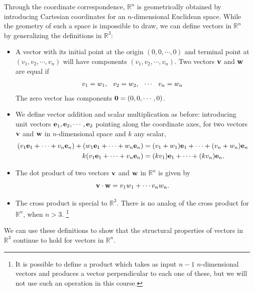 \documentclass[12pt,letterpaper,reqno]{article}
\numberwithin{equation}{section}
\begin{document}
Through the coordinate correspondence, $\mathbb{R}^n$ is geometrically obtained by introducing Cartesian coordinates for an $n$-dimensional Euclidean space. While the geometry of such a space is impossible to draw, we can define vectors in $\mathbb{R}^n$ by generalizing the definitions in $\mathbb{R}^3$:
\begin{itemize}
	\item A vector with its initial point at the origin $(0,0,\cdots,0)$ and terminal point at $(v_1,v_2,\cdots,v_n)$ will have components $(v_1,v_2,\cdots,v_n)$. Two vectors ${\bf v}$ and ${\bf w}$ are equal if 
	\begin{align*}
		v_1=w_1, \hspace{0.25cm} v_2=w_2, \hspace{0.25cm} \cdots \hspace{0.25cm} v_n=w_n
	\end{align*}
	The zero vector has components ${\bf 0}=(0,0,\cdots,0)$.
	\item We define vector addition and scalar multiplication as before: introducing unit vectors ${\bf e}_1, {\bf e}_2, \cdots, {\bf e}_2$ pointing along the coordinate axes, for two vectors ${\bf v}$ and ${\bf w}$ in $n$-dimensional space and $k$ any scalar,
\begin{align*}
	(v_1{\bf e}_1+\cdots+v_n{\bf e}_n)+(w_1{\bf e}_1+\cdots+w_n{\bf e}_n)&=(v_1+w_1){\bf e}_1+\cdots +(v_n+w_n){\bf e}_n \\
	k(v_1{\bf e}_1+\cdots+v_n{\bf e}_n)&=(kv_1){\bf e}_1+\cdots+(kv_n){\bf e}_n.
\end{align*}
\item The dot product of two vectors ${\bf v}$ and ${\bf w}$ in $\mathbb{R}^n$ is given by
\begin{align*}
	{\bf v}\cdot {\bf w}=v_1w_1+\cdots v_nw_n.
\end{align*}
\item The cross product is special to $\mathbb{R}^3$. There is no analog of the cross product for $\mathbb{R}^n$, when $n>3$. \footnote{It is possible to define a product which takes as input $n-1$ $n$-dimensional vectors and produces a vector perpendicular to each one of these, but we will not use such an operation in this course.}
\end{itemize}

We can use these definitions to show that the structural properties of vectors in $\mathbb{R}^3$ continue to hold for vectors in $\mathbb{R}^n$.
\end{document}
